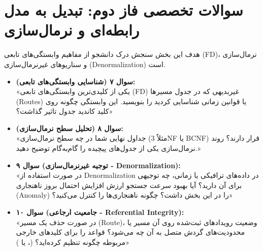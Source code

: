 \documentclass[12pt]{article}
\begin{document}
\section{سوالات تخصصی فاز دوم: تبدیل به مدل رابطه‌ای و نرمال‌سازی}
هدف این بخش سنجش درک دانشجو از مفاهیم وابستگی‌های تابعی (FD)، نرمال‌سازی و سناریوهای غیرنرمال‌سازی (Denormalization) است.
\begin{itemize}[label=$\bullet$, leftmargin=*]
    \item \textbf{سوال ۷ (شناسایی وابستگی‌های تابعی):} \\
    «یکی از کلیدی‌ترین وابستگی‌های تابعی (FD) غیربدیهی که در جدول مسیرها (Routes) یا قوانین زمانی شناسایی کردید را بنویسید. این وابستگی چگونه روی کلید کاندید جدول تاثیر گذاشت؟»
    \item \textbf{سوال ۸ (تحلیل سطح نرمال‌سازی):} \\
    «جداول نهایی شما در چه سطح نرمال‌سازی (مثلاً 3NF یا BCNF) قرار دارند؟ روند نرمال‌سازی یکی از جدول‌های پیچیده را گام‌به‌گام توضیح دهید.»
    \item \textbf{سوال ۹ (توجیه غیرنرمال‌سازی - Denormalization):} \\
    «در صورت استفاده از Denormalization در داده‌های ترافیکی یا زمانی، چه توجیهی برای آن دارید؟ آیا بهبود سرعت جستجو ارزش افزایش احتمال بروز ناهنجاری (Anomaly) را در این بخش داشت؟ چگونه ناهنجاری‌ها را کنترل می‌کنید؟»
    \item \textbf{سوال ۱۰ (جامعیت ارجاعی - Referential Integrity):} \\
    «در صورت حذف یک مسیر (Route)، وضعیت رویدادهای ثبت‌شده روی آن مسیر یا محدودیت‌های گردش متصل به آن چه می‌شود؟ قواعد  را برای کلیدهای خارجی مربوطه چگونه تنظیم کرده‌اید؟ (،  یا )»
\end{itemize}
\end{document}
